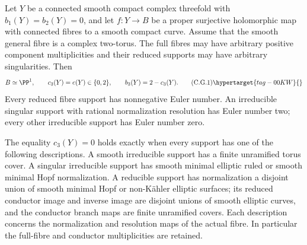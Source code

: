 
\begin{theorem}
\hypertarget{tag-01BZ}{}\label{cdp:st:C.2.G.1}


Let $Y$ be a connected smooth compact complex threefold with
$b_1(Y)=b_2(Y)=0$, and let $f:Y\to B$ be a proper surjective
holomorphic map with connected fibres to a smooth compact curve.
Assume that the smooth general fibre is a complex two-torus.
The full fibres may have arbitrary positive component multiplicities
and their reduced supports may have arbitrary singularities. Then
\[
 B\simeq\PP^1,\qquad
 c_3(Y)=e(Y)\in\{0,2\},\qquad b_3(Y)=2-c_3(Y).
 \tag{C.G.1}\hypertarget{tag-00KW}{}\label{cdp:eq:C.G.1}
\]
Every reduced fibre support has nonnegative Euler number.
An irreducible singular support with rational normalization
resolution has Euler number two; every other irreducible support
has Euler number zero.

The equality $c_3(Y)=0$ holds exactly when every support has one
of the following descriptions. A smooth irreducible support has
a finite unramified torus cover. A singular irreducible support
has smooth minimal elliptic ruled or smooth minimal Hopf
normalization. A reducible support has normalization a disjoint
union of smooth minimal Hopf or non-K\"ahler elliptic surfaces;
its reduced conductor image and inverse image are disjoint
unions of smooth elliptic curves, and the conductor branch maps
are finite unramified covers. Each description concerns the
normalization and resolution maps of the actual fibre. In
particular the full-fibre and conductor multiplicities are
retained.
\end{theorem}

